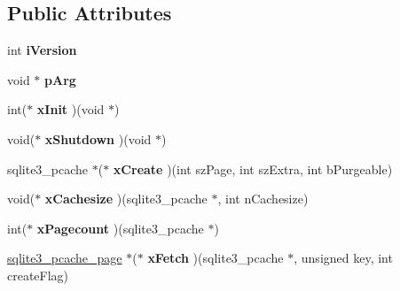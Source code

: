 \subsection*{Public Attributes}
\begin{DoxyCompactItemize}
\item 
\mbox{\label{structsqlite3__pcache__methods2_a03b27be6c7cb8f1d2662c454cbe58483}} 
int {\bfseries i\+Version}
\item 
\mbox{\label{structsqlite3__pcache__methods2_a4bea91c33987eef02122bbf8a49745de}} 
void $\ast$ {\bfseries p\+Arg}
\item 
\mbox{\label{structsqlite3__pcache__methods2_a8f77114458576c9d75cd53822fcd3462}} 
int($\ast$ {\bfseries x\+Init} )(void $\ast$)
\item 
\mbox{\label{structsqlite3__pcache__methods2_a00a780e295b89976940cd3cba2cfeaee}} 
void($\ast$ {\bfseries x\+Shutdown} )(void $\ast$)
\item 
\mbox{\label{structsqlite3__pcache__methods2_a91e7752b826e19e7c51c1fa0ce530f0f}} 
sqlite3\+\_\+pcache $\ast$($\ast$ {\bfseries x\+Create} )(int sz\+Page, int sz\+Extra, int b\+Purgeable)
\item 
\mbox{\label{structsqlite3__pcache__methods2_a4889ab0903938f485aa0fa4fc6925d26}} 
void($\ast$ {\bfseries x\+Cachesize} )(sqlite3\+\_\+pcache $\ast$, int n\+Cachesize)
\item 
\mbox{\label{structsqlite3__pcache__methods2_a5d51aba3927db1da9acf31fbdf7d57b5}} 
int($\ast$ {\bfseries x\+Pagecount} )(sqlite3\+\_\+pcache $\ast$)
\item 
\mbox{\label{structsqlite3__pcache__methods2_ac74dd2b35193a4309494311995da2d25}} 
\hyperlink{structsqlite3__pcache__page}{sqlite3\+\_\+pcache\+\_\+page} $\ast$($\ast$ {\bfseries x\+Fetch} )(sqlite3\+\_\+pcache $\ast$, unsigned key, int create\+Flag)
\item 
\mbox{\label{structsqlite3__pcache__methods2_ac94294551eda282f17b1ed2a110e1850}} 

\end{DoxyCompactItemize}
